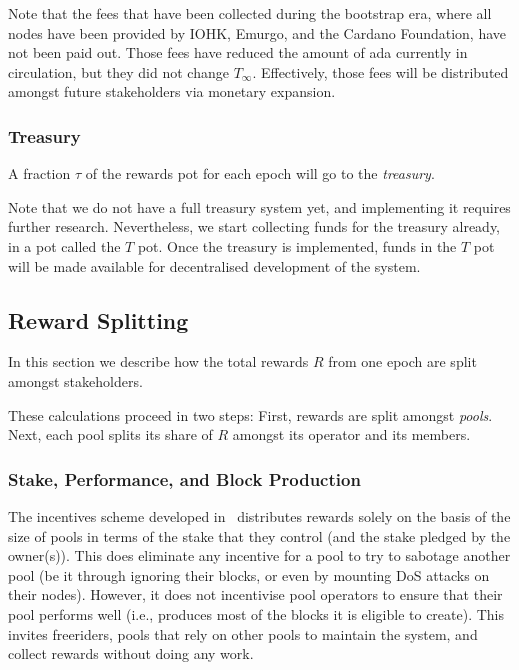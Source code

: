 \documentclass[11pt,a4paper]{article}
\begin{document}
Note that the fees that have been collected during the bootstrap era,
where all nodes have been provided by IOHK, Emurgo, and the Cardano
Foundation, have not been paid out. Those fees have reduced the amount
of ada currently in circulation, but they did not change
\(T_\infty\). Effectively, those fees will be distributed amongst
future stakeholders via monetary expansion.

\subsubsection{Treasury}
\label{treasury}

A fraction \(\tau\) of the rewards pot for each epoch will go to the
\emph{treasury}.

Note that we do not have a full treasury system yet, and implementing it
requires further research. Nevertheless, we start collecting funds for the
treasury already, in a pot called the \(T\) pot. Once the treasury is
implemented, funds in the \(T\) pot will be made available for decentralised
development of the system.

\subsection{Reward Splitting}
\label{reward-splitting}

In this section we describe how the total rewards \(R\) from one epoch
are split amongst stakeholders.

These calculations proceed in two steps: First, rewards are split
amongst \emph{pools}. Next, each pool splits its share of \(R\) amongst
its operator and its members.

\subsubsection{Stake, Performance, and Block Production}
\label{stake-performance-and-block-production}

The incentives scheme developed in~\citep{bkks2018} distributes rewards solely
on the basis of the size of pools in terms of the stake that they control (and
the stake pledged by the owner(s)). This does eliminate any incentive for a pool
to try to sabotage another pool (be it through ignoring their blocks, or even by
mounting DoS attacks on their nodes). However, it does not incentivise pool
operators to ensure that their pool performs well (i.e., produces most of the
blocks it is eligible to create). This invites freeriders, pools that rely on
other pools to maintain the system, and collect rewards without doing any work.
\end{document}
